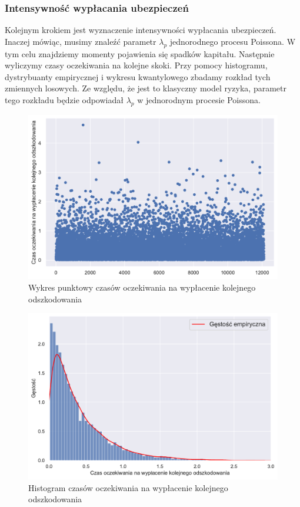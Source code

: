 \documentclass[12pt]{mwart}
\begin{document}
	
	
	\subsubsection{Intensywność wypłacania ubezpieczeń}
	\noindent Kolejnym krokiem jest wyznaczenie intensywności wypłacania ubezpieczeń. Inaczej mówiąc, musimy znaleźć parametr $\lambda_{p}$ jednorodnego procesu Poissona. W tym celu znajdziemy momenty pojawienia się spadków kapitału. Następnie wyliczymy czasy oczekiwania na kolejne skoki. Przy pomocy histogramu, dystrybuanty empirycznej i wykresu kwantylowego zbadamy rozkład tych zmiennych losowych. Ze względu, że jest to klasyczny model ryzyka, parametr tego rozkładu będzie odpowiadał $\lambda_{p}$ w jednorodnym procesie Poissona.
	
	
	\begin{figure}[H]
	\begin{center}
		\includegraphics[scale=0.5]{scatter2.pdf}
		\caption{Wykres punktowy czasów oczekiwania na wypłacenie \newline kolejnego odszkodowania}
	\end{center}
	\end{figure}
	
	\begin{figure}[H]
	\begin{center}
		\includegraphics[scale=0.5]{histogram2.pdf}
		\caption{Histogram czasów oczekiwania na wypłacenie \newline kolejnego odszkodowania}
	\end{center}
	\end{figure}
	
\end{document}
